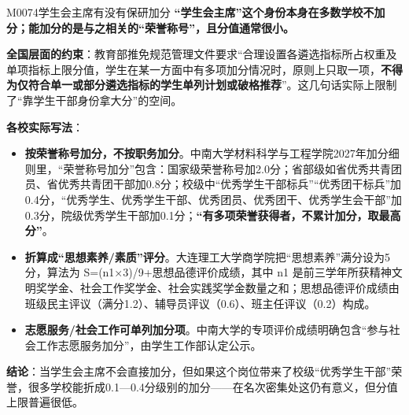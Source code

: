 \begin{qa}{M0074}{学生会主席有没有保研加分}
\textbf{“学生会主席”这个身份本身在多数学校不加分；能加分的是与之相关的“荣誉称号”，且分值通常很小。}

\textbf{全国层面的约束}：教育部推免规范管理文件要求“合理设置各遴选指标所占权重及单项指标上限分值，学生在某一方面中有多项加分情况时，原则上只取一项，\textbf{不得为仅符合单一或部分遴选指标的学生单列计划或破格推荐}”。这几句话实际上限制了“靠学生干部身份拿大分”的空间。

\textbf{各校实际写法}：

\begin{itemize}
  \item \textbf{按荣誉称号加分，不按职务加分}。中南大学材料科学与工程学院2027年加分细则里，“荣誉称号加分”包含：国家级荣誉称号加2.0分；省部级如省优秀共青团员、省优秀共青团干部加0.8分；校级中“优秀学生干部标兵”“优秀团干标兵”加0.4分，“优秀学生、优秀学生干部、优秀团员、优秀团干、优秀学生会干部”加0.3分，院级优秀学生干部加0.1分；\textbf{“有多项荣誉获得者，不累计加分，取最高分”}。
  \item \textbf{折算成“思想素养/素质”评分}。大连理工大学商学院把“思想素养”满分设为5分，算法为 S=(n1×3)/9+思想品德评价成绩，其中 n1 是前三学年所获精神文明奖学金、社会工作奖学金、社会实践奖学金数量之和；思想品德评价成绩由班级民主评议（满分1.2）、辅导员评议（0.6）、班主任评议（0.2）构成。
  \item \textbf{志愿服务/社会工作可单列加分项}。中南大学的专项评价成绩明确包含“参与社会工作志愿服务加分”，由学生工作部认定公示。
\end{itemize}

\textbf{结论}：当学生会主席不会直接加分，但如果这个岗位带来了校级“优秀学生干部”荣誉，很多学校能折成0.1—0.4分级别的加分——在名次密集处这仍有意义，但分值上限普遍很低。
\end{qa}

